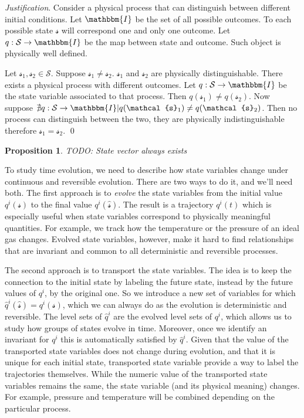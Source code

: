 \documentclass[aps,pra,10pt,twocolumn,floatfix,nofootinbib]{revtex4-1}
\newtheorem{prop}{Proposition}[section]
\theoremstyle{definition}
\newenvironment{justification}{\emph{Justification}.}{\qed}
\begin{document}
\begin{justification}
Consider a physical process that can distinguish between different initial conditions. Let $\mathbbm{I}$ be the set of all possible outcomes. To each possible state $\mathcal{s}$ will correspond one and only one outcome. Let $q : \mathcal{S} \rightarrow \mathbbm{I}$ be the map between state and outcome. Such object is physically well defined.

Let $\mathcal{s}_1, \mathcal{s}_2 \in \mathcal{S}$. Suppose $\mathcal{s}_1 \neq \mathcal{s}_2$. $\mathcal{s}_1$ and $\mathcal{s}_2$ are physically distinguishable. There exists a physical process with different outcomes. Let $q : \mathcal{S} \rightarrow \mathbbm{I}$ be the state variable associated to that process. Then $q(\mathcal{s}_1)\neq q(\mathcal{s}_2)$. Now suppose $\nexists q : \mathcal{S} \rightarrow \mathbbm{I} | q(\mathcal{s}_1) \neq q(\mathcal{s}_2)$. Then no process can distinguish between the two, they are physically indistinguishable therefore $\mathcal{s}_1 = \mathcal{s}_2$.
\end{justification}

\begin{prop}\label{state_vector}
TODO: State vector always exists
\end{prop}

To study time evolution, we need to describe how state variables change under continuous and reversible evolution. There are two ways to do it, and we'll need both. The first approach is to \emph{evolve} the state variables from the initial value $q^i(\mathcal{s})$ to the final value $q^i(\hat{\mathcal{s}})$. The result is a trajectory $q^i(t)$ which is especially useful when state variables correspond to physically meaningful quantities. For example, we track how the temperature or the pressure of an ideal gas changes. Evolved state variables, however, make it hard to find relationships that are invariant and common to all deterministic and reversible processes.

The second approach is to transport the state variables. The idea is to keep the connection to the initial state by labeling the future state, instead by the future values of $q^i$, by the original one. So we introduce a new set of variables for which $\hat{q}^i(\hat{\mathcal{s}})=q^i(\mathcal{s})$, which we can always do as the evolution is deterministic and reversible. The level sets of $\hat{q}^i$ are the evolved level sets of $q^i$, which allows us to study how groups of states evolve in time. Moreover, once we identify an invariant for $q^i$ this is automatically satisfied by $\hat{q}^i$. Given that the value of the transported state variables does not change during evolution, and that it is unique for each initial state, transported state variable provide a way to label the trajectories themselves. While the numeric value of the transported state variables remains the same, the state variable (and its physical meaning) changes. For example, pressure and temperature will be combined depending on the particular process.
\end{document}
